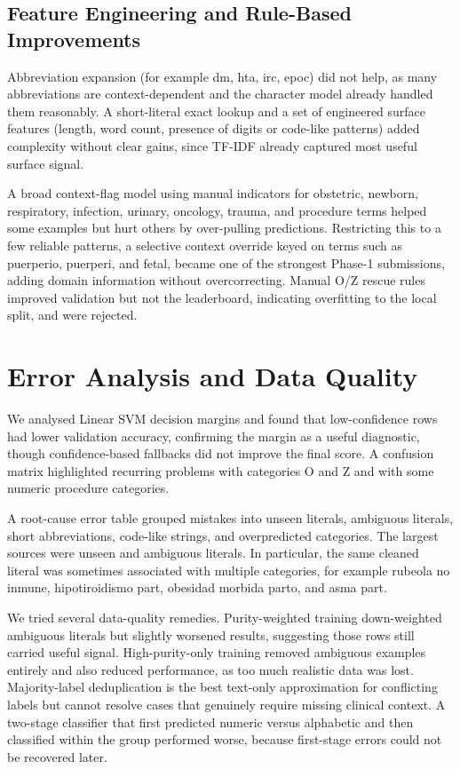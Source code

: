 \documentclass[9pt,a4paper,twoside]{utils/tau-class/tau}
\begin{document}
\subsection{Feature Engineering and Rule-Based Improvements}

Abbreviation expansion (for example dm, hta, irc, epoc) did not help, as many abbreviations are context-dependent and the character model already handled them reasonably. A short-literal exact lookup and a set of engineered surface features (length, word count, presence of digits or code-like patterns) added complexity without clear gains, since TF-IDF already captured most useful surface signal.

A broad context-flag model using manual indicators for obstetric, newborn, respiratory, infection, urinary, oncology, trauma, and procedure terms helped some examples but hurt others by over-pulling predictions. Restricting this to a few reliable patterns, a selective context override keyed on terms such as puerperio, puerperi, and fetal, became one of the strongest Phase-1 submissions, adding domain information without overcorrecting. Manual O/Z rescue rules improved validation but not the leaderboard, indicating overfitting to the local split, and were rejected.

\section{Error Analysis and Data Quality}

We analysed Linear SVM decision margins and found that low-confidence rows had lower validation accuracy, confirming the margin as a useful diagnostic, though confidence-based fallbacks did not improve the final score. A confusion matrix highlighted recurring problems with categories O and Z and with some numeric procedure categories.

A root-cause error table grouped mistakes into unseen literals, ambiguous literals, short abbreviations, code-like strings, and overpredicted categories. The largest sources were unseen and ambiguous literals. In particular, the same cleaned literal was sometimes associated with multiple categories, for example rubeola no inmune, hipotiroidismo part, obesidad morbida parto, and asma part.

We tried several data-quality remedies. Purity-weighted training down-weighted ambiguous literals but slightly worsened results, suggesting those rows still carried useful signal. High-purity-only training removed ambiguous examples entirely and also reduced performance, as too much realistic data was lost. Majority-label deduplication is the best text-only approximation for conflicting labels but cannot resolve cases that genuinely require missing clinical context. A two-stage classifier that first predicted numeric versus alphabetic and then classified within the group performed worse, because first-stage errors could not be recovered later.
\end{document}
